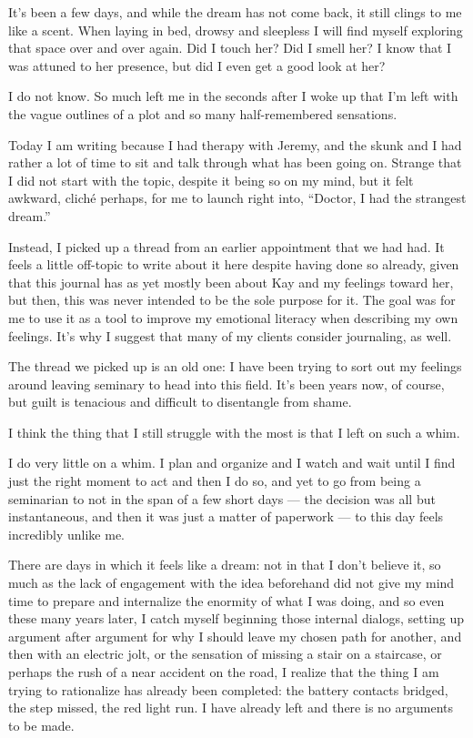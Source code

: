 It's been a few days, and while the dream has not come back, it still clings to me like a scent. When laying in bed, drowsy and sleepless I will find myself exploring that space over and over again. Did I touch her? Did I smell her? I know that I was attuned to her presence, but did I even get a good look at her?

I do not know. So much left me in the seconds after I woke up that I'm left with the vague outlines of a plot and so many half-remembered sensations.

Today I am writing because I had therapy with Jeremy, and the skunk and I had rather a lot of time to sit and talk through what has been going on. Strange that I did not start with the topic, despite it being so on my mind, but it felt awkward, cliché perhaps, for me to launch right into, ``Doctor, I had the strangest dream.''

Instead, I picked up a thread from an earlier appointment that we had had. It feels a little off-topic to write about it here despite having done so already, given that this journal has as yet mostly been about Kay and my feelings toward her, but then, this was never intended to be the sole purpose for it. The goal was for me to use it as a tool to improve my emotional literacy when describing my own feelings. It's why I suggest that many of my clients consider journaling, as well.

The thread we picked up is an old one: I have been trying to sort out my feelings around leaving seminary to head into this field. It's been years now, of course, but guilt is tenacious and difficult to disentangle from shame.

I think the thing that I still struggle with the most is that I left on such a whim.

I do very little on a whim. I plan and organize and I watch and wait until I find just the right moment to act and then I do so, and yet to go from being a seminarian to not in the span of a few short days --- the decision was all but instantaneous, and then it was just a matter of paperwork --- to this day feels incredibly unlike me.

There are days in which it feels like a dream: not in that I don't believe it, so much as the lack of engagement with the idea beforehand did not give my mind time to prepare and internalize the enormity of what I was doing, and so even these many years later, I catch myself beginning those internal dialogs, setting up argument after argument for why I should leave my chosen path for another, and then with an electric jolt, or the sensation of missing a stair on a staircase, or perhaps the rush of a near accident on the road, I realize that the thing I am trying to rationalize has already been completed: the battery contacts bridged, the step missed, the red light run. I have already left and there is no arguments to be made.

